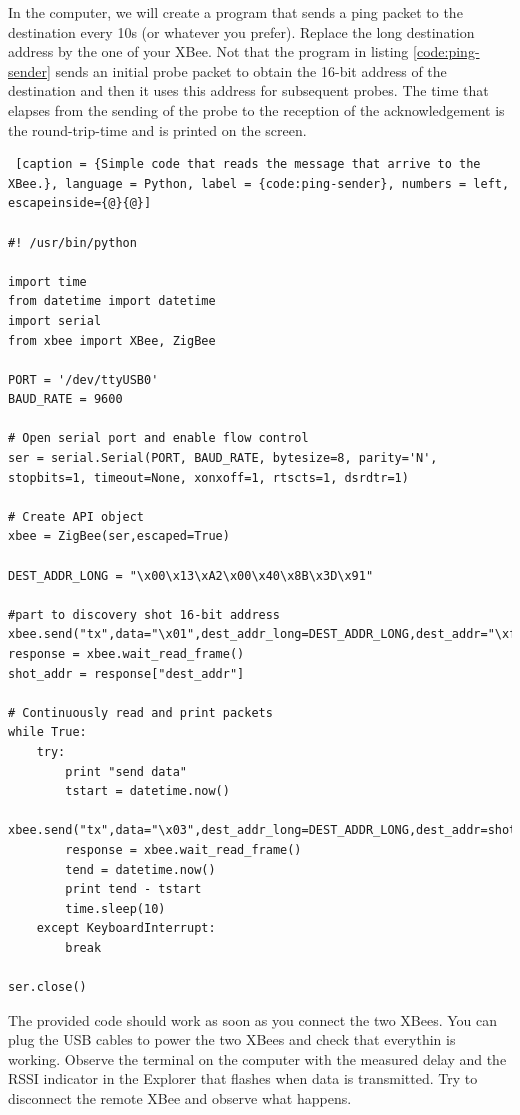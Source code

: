 In the computer, we will create a program that sends a ping packet to the destination every 10s (or whatever you prefer).
Replace the long destination address by the one of your XBee.
Not that the program in listing \ref{code:ping-sender} sends an initial probe packet to obtain the 16-bit address of the destination and then it uses this address for subsequent probes.
The time that elapses from the sending of the probe to the reception of the acknowledgement is the round-trip-time and is printed on the screen.

\begin{lstlisting} [caption = {Simple code that reads the message that arrive to the XBee.}, language = Python, label = {code:ping-sender}, numbers = left, escapeinside={@}{@}]

#! /usr/bin/python

import time
from datetime import datetime
import serial
from xbee import XBee, ZigBee

PORT = '/dev/ttyUSB0'
BAUD_RATE = 9600

# Open serial port and enable flow control
ser = serial.Serial(PORT, BAUD_RATE, bytesize=8, parity='N', stopbits=1, timeout=None, xonxoff=1, rtscts=1, dsrdtr=1)

# Create API object
xbee = ZigBee(ser,escaped=True)

DEST_ADDR_LONG = "\x00\x13\xA2\x00\x40\x8B\x3D\x91"

#part to discovery shot 16-bit address
xbee.send("tx",data="\x01",dest_addr_long=DEST_ADDR_LONG,dest_addr="\xff\xfe")
response = xbee.wait_read_frame()
shot_addr = response["dest_addr"]

# Continuously read and print packets
while True:
    try:
        print "send data"
        tstart = datetime.now()
        xbee.send("tx",data="\x03",dest_addr_long=DEST_ADDR_LONG,dest_addr=shot_addr)
        response = xbee.wait_read_frame()
        tend = datetime.now()
        print tend - tstart
        time.sleep(10)
    except KeyboardInterrupt:
        break

ser.close()

\end{lstlisting}

The provided code should work as soon as you connect the two XBees. 
You can plug the USB cables to power the two XBees and check that everythin is working.
Observe the terminal on the computer with the measured delay and the RSSI indicator in the Explorer that flashes when data is transmitted.
Try to disconnect the remote XBee and observe what happens.

